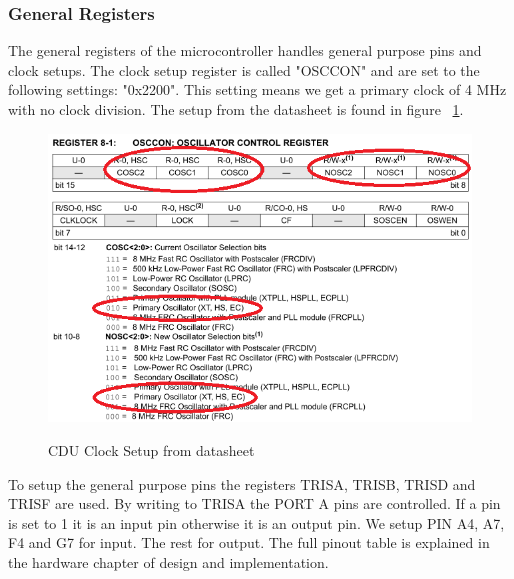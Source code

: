 \subsubsection{General Registers}
The general registers of the microcontroller handles general purpose pins and clock setups. The clock setup register is called "OSCCON" and are set to the following settings: "0x2200". This setting means we get a primary clock of 4 MHz with no clock division. The setup from the datasheet is found in figure ~\ref{fig:clocksetup}.\\
\begin{figure}[H]
\centering
\includegraphics[width=1\textwidth]{billeder/clocksetup}
\label{fig:clocksetup}
\caption{CDU Clock Setup from datasheet}
\end{figure}
To setup the general purpose pins the registers TRISA, TRISB, TRISD and TRISF are used. By writing to TRISA the PORT A pins are controlled. If a pin is set to 1 it is an input pin otherwise it is an output pin. We setup PIN A4, A7, F4 and G7 for input. The rest for output. The full pinout table is explained in the hardware chapter of design and implementation.
